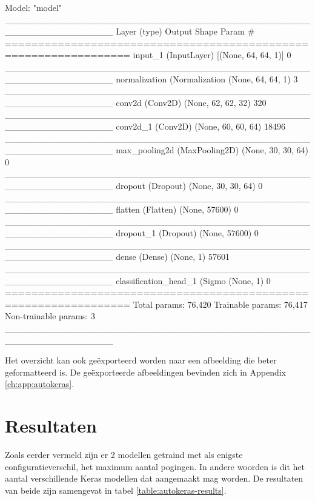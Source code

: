 \begin{python}
Model: "model"
_________________________________________________________________
Layer (type)                 Output Shape              Param #   
=================================================================
input_1 (InputLayer)         [(None, 64, 64, 1)]       0         
_________________________________________________________________
normalization (Normalization (None, 64, 64, 1)         3         
_________________________________________________________________
conv2d (Conv2D)              (None, 62, 62, 32)        320       
_________________________________________________________________
conv2d_1 (Conv2D)            (None, 60, 60, 64)        18496     
_________________________________________________________________
max_pooling2d (MaxPooling2D) (None, 30, 30, 64)        0         
_________________________________________________________________
dropout (Dropout)            (None, 30, 30, 64)        0         
_________________________________________________________________
flatten (Flatten)            (None, 57600)             0         
_________________________________________________________________
dropout_1 (Dropout)          (None, 57600)             0         
_________________________________________________________________
dense (Dense)                (None, 1)                 57601     
_________________________________________________________________
classification_head_1 (Sigmo (None, 1)                 0         
=================================================================
Total params: 76,420
Trainable params: 76,417
Non-trainable params: 3
_________________________________________________________________
\end{python}

Het overzicht kan ook geëxporteerd worden naar een afbeelding die beter geformatteerd is. De geëxporteerde afbeeldingen bevinden zich in Appendix \ref{ch:app:autokeras}.

\section{Resultaten}
\label{sec:results-autokeras}

Zoals eerder vermeld zijn er 2 modellen getraind met als enigste configuratieverschil, het maximum aantal pogingen. In andere woorden is dit het aantal verschillende Keras modellen dat aangemaakt mag worden. De resultaten van beide zijn samengevat in tabel \ref{table:autokeras-results}.

